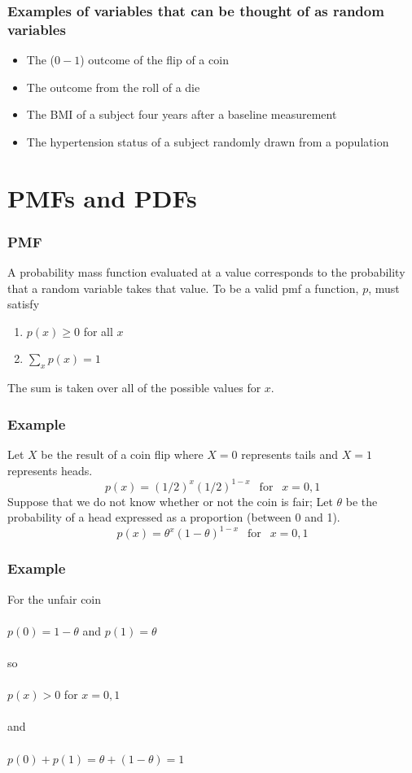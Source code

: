 \documentclass[aspectratio=169]{beamer}
\begin{document}
\begin{frame}
\frametitle{Examples of variables that can be thought of as random variables}
\begin{itemize}
\item The ($0-1$) outcome of the flip of a coin
\item The outcome from the roll of a die
\item The BMI of a subject four years after a baseline measurement
\item The hypertension status of a subject randomly drawn from a population
\end{itemize}
\end{frame}


\section{PMFs and PDFs}
\begin{frame}
\frametitle{PMF}
A probability mass function evaluated at a value corresponds to the
probability that a random variable takes that value. To be a valid
pmf a function, $p$, must satisfy
  \begin{enumerate}
  \item $p(x) \geq 0$ for all $x$
  \item $\sum_{x} p(x) = 1$
  \end{enumerate}
The sum is taken over all of the possible values for $x$.
\end{frame}


\begin{frame}
 \frametitle{Example}
Let $X$ be the result of a coin flip where $X=0$ represents
tails and $X = 1$ represents heads.
$$
p(x) = (1/2)^{x} (1/2)^{1-x} ~~\mbox{ for }~~x = 0,1
$$
Suppose that we do not know whether or not the coin is fair; Let
$\theta$ be the probability of a head expressed as a proportion
(between 0 and 1).
$$
p(x) = \theta^{x} (1 - \theta)^{1-x} ~~\mbox{ for }~~x = 0,1
$$
\end{frame}

\begin{frame}
 \frametitle{Example}
For the unfair coin \\ \ \\
$p(0) = 1 - \theta$ and $p(1) = \theta$ \\ \ \\
so \\ \ \\
$p(x) > 0$ for $x=0,1$ \\ \ \\
and \\ \ \\
$p(0) + p(1) = \theta + (1 - \theta) = 1$
\end{frame}
\end{document}
